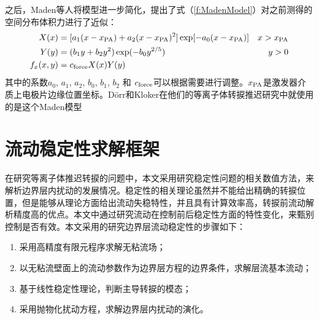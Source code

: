 之后，Maden等人\cite{Maden2013}将模型进一步简化，提出了式（\ref{f:MadenModel}）对之前测得的空间分布体积力进行了近似：
\begin{subequations}\label{f:MadenModel}
\begin{align}
    X(x)&=[a_1(x-x_{\rm PA})+a_2(x-x_{\rm PA})^2]\exp[-a_0(x-x_{\rm PA})] &x>x_{\rm PA}\\
    Y(y)&=(b_1y+b_2y^2)\exp(-b_0y^{2/5}) &y>0\\
    f_x(x,y)&=c_{\rm force}X(x)Y(y)&
\end{align}
\end{subequations}
其中的系数$a_0$, $a_1$, $a_2$, $b_0$, $b_1$,  $b_2$ 和 $c_{\rm force}$可以根据需要进行调整。$x_{\rm PA}$是激发器介质上电极片边缘位置坐标。D\"orr和Kloker\cite{dorr2016,dorr2015stabilisation}在他们的等离子体转捩推迟研究中就使用的是这个Maden模型
\section{流动稳定性求解框架}
在研究等离子体推迟转捩的问题中，本文采用研究稳定性问题的相关数值方法，来解析边界层内扰动的发展情况。稳定性的相关理论虽然并不能给出精确的转捩位置，但是能够从理论方面给出流动失稳特性，并且具有计算效率高，转捩前流动解析精度高的优点。本文中通过研究流动在控制前后稳定性方面的特性变化，来甄别控制是否有效。本文采用的研究边界层流动稳定性的步骤如下：
\begin{enumerate}
  \item 采用高精度有限元程序求解无粘流场；
  \item 以无粘流壁面上的流动参数作为边界层方程的边界条件，求解层流基本流动；
  \item 基于线性稳定性理论，判断主导转捩的模态；
  \item 采用抛物化扰动方程，求解边界层内扰动的演化。
\end{enumerate}

